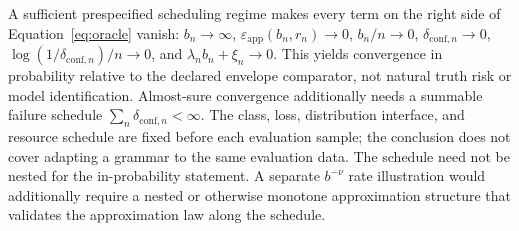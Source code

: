 A sufficient prespecified scheduling regime makes every term on the right side of
Equation~\eqref{eq:oracle} vanish: \(b_n\to\infty\),
\(\varepsilon_{\mathrm{app}}(b_n,r_n)\to0\), \(b_n/n\to0\), \(\delta_{\mathrm{conf},n}\to0\),
\(\log(1/\delta_{\mathrm{conf},n})/n\to0\), and
\(\lambda_nb_n+\xi_n\to0\). This yields convergence in probability relative to the declared
envelope comparator, not natural truth risk or model identification. Almost-sure convergence
additionally needs a summable failure schedule
\(\sum_n\delta_{\mathrm{conf},n}<\infty\). The class, loss, distribution interface, and resource
schedule are fixed before each evaluation sample; the conclusion does not cover adapting a grammar
to the same evaluation data. The schedule need not be nested for the in-probability statement. A separate \(b^{-\nu}\) rate
illustration would additionally require a nested or otherwise monotone approximation structure
that validates the approximation law along the schedule.

